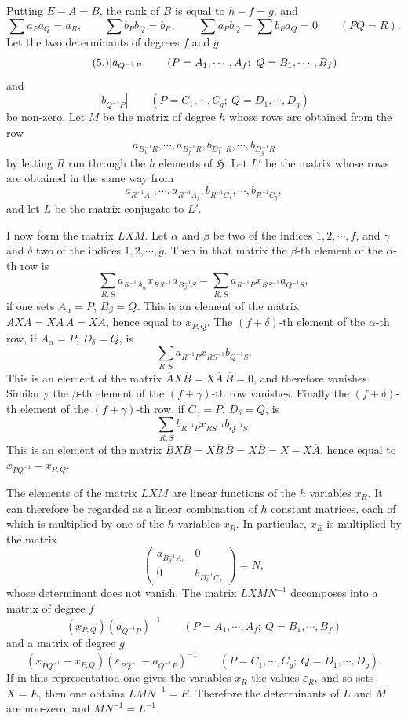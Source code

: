 \documentclass[11pt]{article}
\newcommand{\Hgr}{\mathfrak{H}}
\newcommand{\eps}{\varepsilon}
\begin{document}
Putting $E-A=B$, the rank of $B$ is equal to $h-f=g$, and
\[
\sum a_Pa_Q=a_R,
\qquad
\sum b_Pb_Q=b_R,
\qquad
\sum a_Pb_Q=\sum b_Pa_Q=0\qquad(PQ=R).
\]
Let the two determinants of degrees $f$ and $g$
\begin{equation}\tag{5.}
|a_{Q^{-1}P}|\\[-0.5em]
\qquad(P=A_1,\cdots,A_f;\ Q=B_1,\cdots,B_f)
\end{equation}
and
\[
|b_{Q^{-1}P}|
\qquad(P=C_1,\cdots,C_g;\ Q=D_1,\cdots,D_g)
\]
be non-zero. Let $M$ be the matrix of degree $h$ whose rows are obtained from the row
\[
a_{B_1^{-1}R},\cdots,a_{B_f^{-1}R},b_{D_1^{-1}R},\cdots,b_{D_g^{-1}R}
\]
by letting $R$ run through the $h$ elements of $\Hgr$. Let $L'$ be the matrix whose rows are obtained in the same way from
\[
a_{R^{-1}A_1},\cdots,a_{R^{-1}A_f},b_{R^{-1}C_1},\cdots,b_{R^{-1}C_g},
\]
and let $L$ be the matrix conjugate to $L'$.

I now form the matrix $LXM$. Let $\alpha$ and $\beta$ be two of the indices $1,2,\cdots,f$, and $\gamma$ and $\delta$ two of the indices $1,2,\cdots,g$. Then in that matrix the $\beta$-th element of the $\alpha$-th row is
\[
\sum_{R,S}a_{R^{-1}A_\alpha}x_{RS^{-1}}a_{B_\beta^{-1}S}
=\sum_{R,S}a_{R^{-1}P}x_{RS^{-1}}a_{Q^{-1}S},
\]
if one sets $A_\alpha=P$, $B_\beta=Q$. This is an element of the matrix $\overline{A}X\overline{A}=X\overline{A}\,\overline{A}=X\overline{A}$, hence equal to $x_{P,Q}$. The $(f+\delta)$-th element of the $\alpha$-th row, if $A_\alpha=P$, $D_\delta=Q$, is
\[
\sum_{R,S}a_{R^{-1}P}x_{RS^{-1}}b_{Q^{-1}S}.
\]
This is an element of the matrix $\overline{A}X\overline{B}=X\overline{A}\,\overline{B}=0$, and therefore vanishes. Similarly the $\beta$-th element of the $(f+\gamma)$-th row vanishes. Finally the $(f+\delta)$-th element of the $(f+\gamma)$-th row, if $C_\gamma=P$, $D_\delta=Q$, is
\[
\sum_{R,S}b_{R^{-1}P}x_{RS^{-1}}b_{Q^{-1}S}.
\]
This is an element of the matrix $\overline{B}X\overline{B}=X\overline{B}\,\overline{B}=X\overline{B}=X-X\overline{A}$, hence equal to $x_{PQ^{-1}}-x_{P,Q}$.

The elements of the matrix $LXM$ are linear functions of the $h$ variables $x_R$. It can therefore be regarded as a linear combination of $h$ constant matrices, each of which is multiplied by one of the $h$ variables $x_R$. In particular, $x_E$ is multiplied by the matrix
\[
\begin{pmatrix}
a_{B_\beta^{-1}A_\alpha}&0\\
0&b_{D_\delta^{-1}C_\gamma}
\end{pmatrix}=N,
\]
whose determinant does not vanish. The matrix $LXMN^{-1}$ decomposes into a matrix of degree $f$
\[
(x_{P,Q})(a_{Q^{-1}P})^{-1}
\qquad(P=A_1,\cdots,A_f;\ Q=B_1,\cdots,B_f)
\]
and a matrix of degree $g$
\[
(x_{PQ^{-1}}-x_{P,Q})(\eps_{PQ^{-1}}-a_{Q^{-1}P})^{-1}
\qquad(P=C_1,\cdots,C_g;\ Q=D_1,\cdots,D_g).
\]
If in this representation one gives the variables $x_R$ the values $\eps_R$, and so sets $X=E$, then one obtains $LMN^{-1}=E$. Therefore the determinants of $L$ and $M$ are non-zero, and $MN^{-1}=L^{-1}$.
\end{document}
